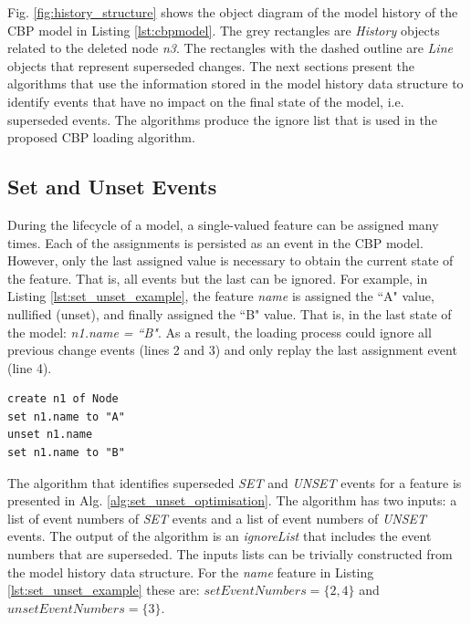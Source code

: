 \documentclass[12pt, a4paper]{report} \usepackage[titletoc]{appendix}
\begin{document}
Fig. \ref{fig:history_structure} shows the object diagram of the model history of the CBP model in Listing \ref{lst:cbpmodel}. The grey rectangles are \emph{History} objects related to the deleted node \emph{n3}. The rectangles with the dashed outline are \emph{Line} objects that represent superseded changes. The next sections present the algorithms that use the information stored in the model history data structure to identify events that have no impact on the final state of the model, i.e. superseded events. The algorithms produce the ignore list that is used in the proposed CBP loading algorithm.

\subsection{Set and Unset Events}
\label{subsec:set_and_unset_events}
During the lifecycle of a model, a single-valued feature can be assigned many times. Each of the assignments is persisted as an event in the CBP model. However, only the last assigned value is necessary to obtain the current state of the feature.  That is, all events but the last can be ignored. For example, in Listing \ref{lst:set_unset_example}, the feature \emph{name} is assigned the ``A" value, nullified (unset), and finally assigned the ``B" value. That is, in the last state of the model: \emph{n1.name = ``B"}. As a result, the loading process could ignore all previous change events (lines 2 and 3) and only replay the last assignment event (line 4). 

\begin{lstlisting}[style=eol,caption={The CBP representation of attribute \emph{name} assignments.},label=lst:set_unset_example]
create n1 of Node
set n1.name to "A"
unset n1.name
set n1.name to "B"
\end{lstlisting}

The algorithm that identifies superseded \emph{SET} and \emph{UNSET} events for a feature is presented in Alg. \ref{alg:set_unset_optimisation}. The algorithm has two inputs: a list of event numbers of \emph{SET} events and a list of event numbers of \emph{UNSET} events. The output of the algorithm is an \emph{ignoreList} that includes the event numbers that are superseded. The inputs lists can be trivially constructed from the model history data structure. For the \emph{name} feature in Listing \ref{lst:set_unset_example} these are: $setEventNumbers = \{2,4\}$ and $unsetEventNumbers = \{3\}$.
\end{document}
